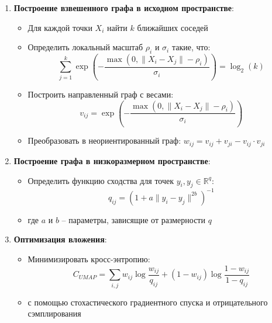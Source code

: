 \documentclass[a4paper,12pt]{article}
\begin{document}
\begin{enumerate}
    \item \textbf{Построение взвешенного графа в исходном пространстве}:
    \begin{itemize}
        \item Для каждой точки $X_i$ найти $k$ ближайших соседей
        \item Определить локальный масштаб $\rho_i$ и $\sigma_i$ такие, что:
        \begin{equation}
            \sum_{j=1}^k \exp\left(-\frac{\max(0, \|X_i - X_j\| - \rho_i)}{\sigma_i}\right) = \log_2(k)
        \end{equation}
        \item Построить направленный граф с весами:
        \begin{equation}
            v_{ij} = \exp\left(-\frac{\max(0, \|X_i - X_j\| - \rho_i)}{\sigma_i}\right)
        \end{equation}
        \item Преобразовать в неориентированный граф: $w_{ij} = v_{ij} + v_{ji} - v_{ij} \cdot v_{ji}$
    \end{itemize}

    \item \textbf{Построение графа в низкоразмерном пространстве}:
    \begin{itemize}
        \item Определить функцию сходства для точек $y_i, y_j \in \mathbb{R}^q$:
        \begin{equation}
            q_{ij} = (1 + a\|y_i - y_j\|^{2b})^{-1}
        \end{equation}
        \item где $a$ и $b$ -- параметры, зависящие от размерности $q$
    \end{itemize}

    \item \textbf{Оптимизация вложения}:
    \begin{itemize}
        \item Минимизировать кросс-энтропию:
        \begin{equation}
            C_{UMAP} = \sum_{i,j} w_{ij} \log\frac{w_{ij}}{q_{ij}} + (1-w_{ij}) \log\frac{1-w_{ij}}{1-q_{ij}}
        \end{equation}
        \item с помощью стохастического градиентного спуска и отрицательного сэмплирования
    \end{itemize}
\end{enumerate}
\end{document}
